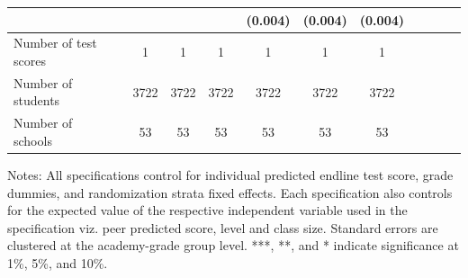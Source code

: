 \begin{center}
\begin{scriptsize}
\begin{threeparttable}
\begin{tabular} {@{} l l c c c c c c c c c c  @{}}
                 &  &  &  &  & (0.004) & (0.004) & (0.004) \\
\midrule
Number of test scores &  & 1 & 1 & 1 & 1 & 1 & 1 \\
Number of students &  & 3722 & 3722 & 3722 & 3722 & 3722 & 3722 \\
Number of schools &  & 53 & 53 & 53 & 53 & 53 & 53 \\
\bottomrule
\end{tabular}
\begin{tablenotes}
\item Notes: All specifications control for individual predicted endline test score, grade dummies, and randomization strata fixed effects. Each specification also controls for the expected value of the respective independent variable used in the specification viz. peer predicted score, level and class size. Standard errors are clustered at the academy-grade group level. ***, **, and * indicate significance at 1\%, 5\%, and 10\%.\end{tablenotes}
\end{threeparttable}
\end{scriptsize}
\end{center}
\clearpage
